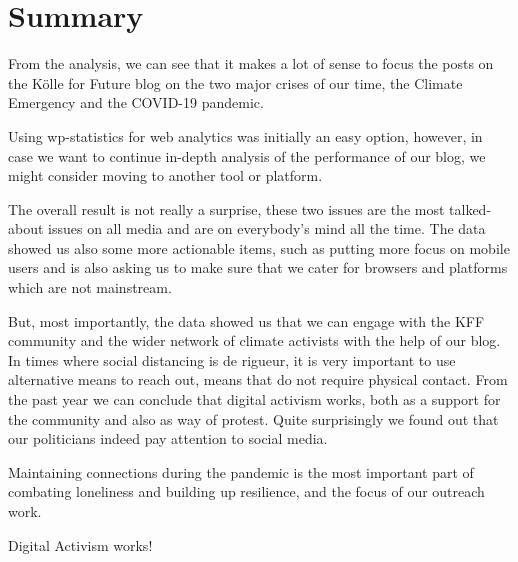 %
%

\pagebreak
\section{Summary}

\onehalfspacing

From the analysis, we can see that it makes a lot of sense to focus the posts on the Kölle for Future blog on the two major crises of our time, the Climate Emergency and the COVID-19 pandemic.

Using wp-statistics for web analytics was initially an easy option, however, in case we want to continue in-depth analysis of the performance of our blog, we might consider moving to another tool or platform.

The overall result is not really a surprise, these two issues are the most talked-about issues on all media and are on everybody's mind all the time. The data showed us also some more actionable items, such as putting more focus on mobile users and is also asking us to make sure that we cater for browsers and platforms which are not mainstream.

But, most importantly, the data showed us that we can engage with the KFF community and the wider network of climate activists with the help of our blog. In times where social distancing is de rigueur, it is very important to use alternative means to reach out, means that do not require physical contact. From the past year we can conclude that digital activism works, both as a support for the community and also as way of protest. Quite surprisingly we found out that our politicians indeed pay attention to social media.

Maintaining connections during the pandemic is the most important part of combating loneliness and building up resilience, and the focus of our outreach work.

Digital Activism works!

